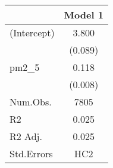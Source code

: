\begin{table}
\centering
\begin{tabular}[t]{lc}
\toprule
  & Model 1\\
\midrule
(Intercept) & \num{3.800}\\
 & (\num{0.089})\\
pm2\_5 & \num{0.118}\\
 & (\num{0.008})\\
\midrule
Num.Obs. & \num{7805}\\
R2 & \num{0.025}\\
R2 Adj. & \num{0.025}\\
Std.Errors & HC2\\
\bottomrule
\end{tabular}
\end{table}
